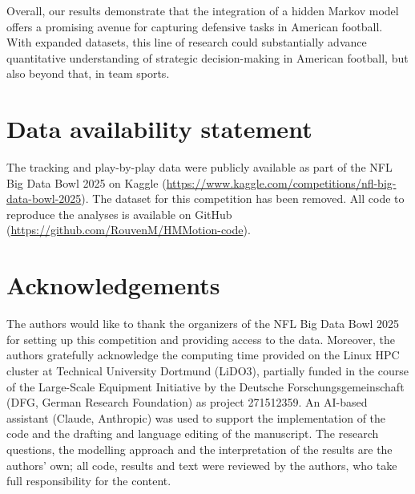 \documentclass[namedate,webpdf,modern,medium]{oup-authoring-template}
\begin{document}
Overall, our results demonstrate that the integration of a hidden Markov model offers a promising avenue for capturing defensive tasks in American football. With expanded datasets, this line of research could substantially advance quantitative understanding of strategic decision-making in American football, but also beyond that, in team sports.

\section*{Data availability statement}

The tracking and play-by-play data were publicly available as part of the NFL Big Data Bowl 2025 on Kaggle (\url{https://www.kaggle.com/competitions/nfl-big-data-bowl-2025}). The dataset for this competition has been removed. All code to reproduce the analyses is available on GitHub (\url{https://github.com/RouvenM/HMMotion-code}).


\section*{Acknowledgements}
The authors would like to thank the organizers of the NFL Big Data Bowl 2025 for setting up this competition and providing access to the data.
Moreover, the authors gratefully acknowledge the computing time provided on the Linux HPC cluster at Technical University Dortmund (LiDO3), partially funded in the course of the Large-Scale Equipment Initiative by the Deutsche Forschungsgemeinschaft (DFG, German Research Foundation) as project 271512359. An AI-based assistant (Claude, Anthropic) was used to support the implementation of the code and the drafting and language editing of the manuscript. The research questions, the modelling approach and the interpretation of the results are the authors' own; all code, results and text were reviewed by the authors, who take full responsibility for the content.
%
\end{document}
